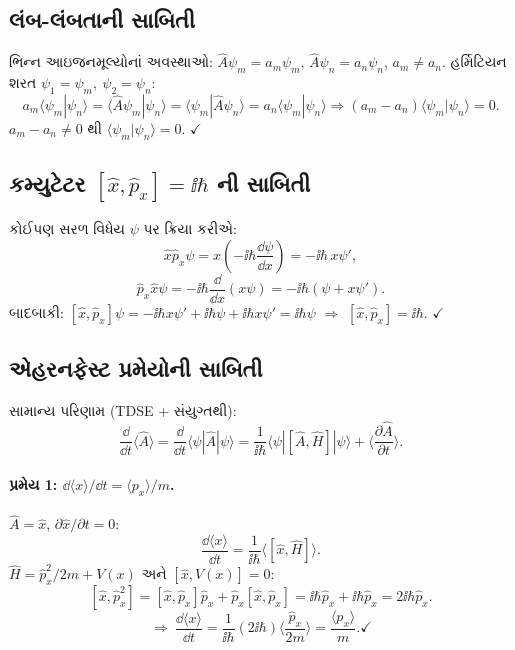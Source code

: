 \subsection{લંબ-લંબતાની સાબિતી}
ભિન્ન આઇજનમૂલ્યોનાં અવસ્થાઓ: $\hat A\psi_m=a_m\psi_m$, $\hat A\psi_n=a_n\psi_n$, $a_m\neq a_n$.
હર્મિટિયન શરત $\psi_1=\psi_m,\ \psi_2=\psi_n$:
\[
a_m\langle\psi_m|\psi_n\rangle=\langle\hat A\psi_m|\psi_n\rangle=\langle\psi_m|\hat A\psi_n\rangle=a_n\langle\psi_m|\psi_n\rangle
\Rightarrow (a_m-a_n)\langle\psi_m|\psi_n\rangle=0 .
\]
$a_m-a_n\neq0$ થી $\langle\psi_m|\psi_n\rangle=0$. $\checkmark$

\subsection{કમ્યુટેટર $[\hat x,\hat p_x]=\ii\hbar$ ની સાબિતી}
કોઈપણ સરળ વિધેય $\psi$ પર ક્રિયા કરીએ:
\[
\hat x\hat p_x\psi=x\left(-\ii\hbar\frac{\dd\psi}{\dd x}\right)=-\ii\hbar\,x\psi',
\]
\[
\hat p_x\hat x\psi=-\ii\hbar\frac{\dd}{\dd x}(x\psi)=-\ii\hbar(\psi+x\psi').
\]
બાદબાકી: $[\hat x,\hat p_x]\psi=-\ii\hbar x\psi'+\ii\hbar\psi+\ii\hbar x\psi'=\ii\hbar\psi$ $\Rightarrow$ $[\hat x,\hat p_x]=\ii\hbar$. $\checkmark$

\subsection{એહરનફેસ્ટ પ્રમેયોની સાબિતી}
સામાન્ય પરિણામ (TDSE + સંયુગ્તથી):
\begin{equation}
\frac{\dd}{\dd t}\langle\hat A\rangle=\frac{\dd}{\dd t}\langle\psi|\hat A|\psi\rangle
=\frac{1}{\ii\hbar}\langle\psi|[\hat A,\hat H]|\psi\rangle+\Big\langle\frac{\partial\hat A}{\partial t}\Big\rangle .
\label{eq:ehrenfestgeneral}
\end{equation}

\paragraph{પ્રમેય 1: $\dd\langle x\rangle/\dd t=\langle p_x\rangle/m$.}
$\hat A=\hat x$, $\partial\hat x/\partial t=0$:
\[
\frac{\dd\langle x\rangle}{\dd t}=\frac{1}{\ii\hbar}\langle[\hat x,\hat H]\rangle .
\]
$\hat H=\hat p_x^{2}/2m+V(x)$ અને $[\hat x,V(x)]=0$:
\[
[\hat x,\hat p_x^{2}]=[\hat x,\hat p_x]\hat p_x+\hat p_x[\hat x,\hat p_x]=\ii\hbar\hat p_x+\ii\hbar\hat p_x=2\ii\hbar\hat p_x .
\]
\[
\Rightarrow\ \frac{\dd\langle x\rangle}{\dd t}=\frac{1}{\ii\hbar}(2\ii\hbar)\Big\langle\frac{\hat p_x}{2m}\Big\rangle=\frac{\langle p_x\rangle}{m}. \checkmark
\]

